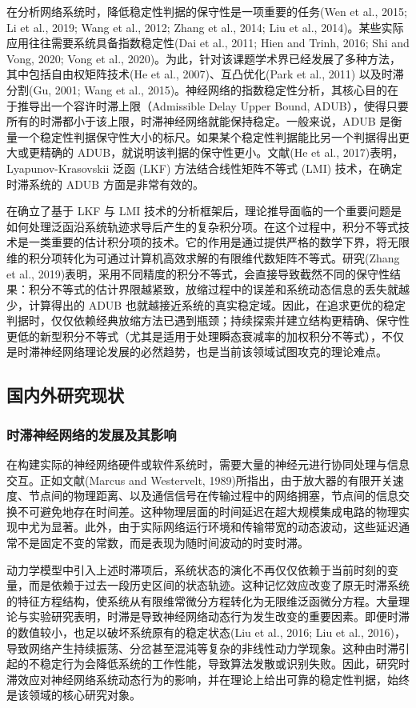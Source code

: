 \documentclass[a4paper, 12pt, oneside]{article}
\theoremstyle{cn_theorem}
\begin{document}
在分析网络系统时，降低稳定性判据的保守性是一项重要的任务(Wen et al., 2015; Li et al., 2019; Wang et al., 2012; Zhang et al., 2014; Liu et al., 2014)。某些实际应用往往需要系统具备指数稳定性(Dai et al., 2011; Hien and Trinh, 2016; Shi and Vong, 2020; Vong et al., 2020)。为此，针对该课题学术界已经发展了多种方法，其中包括自由权矩阵技术(He et al., 2007)、互凸优化(Park et al., 2011) 以及时滞分割(Gu, 2001; Wang et al., 2015)。神经网络的指数稳定性分析，其核心目的在于推导出一个容许时滞上限（Admissible Delay Upper Bound, ADUB），使得只要所有的时滞都小于该上限，时滞神经网络就能保持稳定。一般来说，ADUB 是衡量一个稳定性判据保守性大小的标尺。如果某个稳定性判据能比另一个判据得出更大或更精确的 ADUB，就说明该判据的保守性更小。文献(He et al., 2017)表明，Lyapunov-Krasovskii 泛函 (LKF) 方法结合线性矩阵不等式 (LMI) 技术，在确定时滞系统的 ADUB 方面是非常有效的。

在确立了基于 LKF 与 LMI 技术的分析框架后，理论推导面临的一个重要问题是如何处理泛函沿系统轨迹求导后产生的复杂积分项。在这个过程中，积分不等式技术是一类重要的估计积分项的技术。它的作用是通过提供严格的数学下界，将无限维的积分项转化为可通过计算机高效求解的有限维代数矩阵不等式。研究(Zhang et al., 2019)表明，采用不同精度的积分不等式，会直接导致截然不同的保守性结果：积分不等式的估计界限越紧致，放缩过程中的误差和系统动态信息的丢失就越少，计算得出的 ADUB 也就越接近系统的真实稳定域。因此，在追求更优的稳定判据时，仅仅依赖经典放缩方法已遇到瓶颈；持续探索并建立结构更精确、保守性更低的新型积分不等式（尤其是适用于处理瞬态衰减率的加权积分不等式），不仅是时滞神经网络理论发展的必然趋势，也是当前该领域试图攻克的理论难点。

\subsection{国内外研究现状}

\subsubsection{时滞神经网络的发展及其影响}
在构建实际的神经网络硬件或软件系统时，需要大量的神经元进行协同处理与信息交互。正如文献(Marcus and Westervelt, 1989)所指出，由于放大器的有限开关速度、节点间的物理距离、以及通信信号在传输过程中的网络拥塞，节点间的信息交换不可避免地存在时间差。这种物理层面的时间延迟在超大规模集成电路的物理实现中尤为显著。此外，由于实际网络运行环境和传输带宽的动态波动，这些延迟通常不是固定不变的常数，而是表现为随时间波动的时变时滞。

动力学模型中引入上述时滞项后，系统状态的演化不再仅仅依赖于当前时刻的变量，而是依赖于过去一段历史区间的状态轨迹。这种记忆效应改变了原无时滞系统的特征方程结构，使系统从有限维常微分方程转化为无限维泛函微分方程。大量理论与实验研究表明，时滞是导致神经网络动态行为发生改变的重要因素。即便时滞的数值较小，也足以破坏系统原有的稳定状态(Liu et al., 2016; Liu et al., 2016)，导致网络产生持续振荡、分岔甚至混沌等复杂的非线性动力学现象。这种由时滞引起的不稳定行为会降低系统的工作性能，导致算法发散或识别失败。因此，研究时滞效应对神经网络系统动态行为的影响，并在理论上给出可靠的稳定性判据，始终是该领域的核心研究对象。
\end{document}
